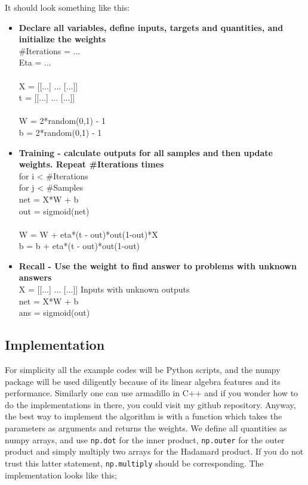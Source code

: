 \documentclass[norsk,a4paper,12pt]{article}
\begin{document}
It should look something like this:
\begin{itemize}
\item \textbf{Declare all variables, define inputs, targets and quantities, and initialize the weights}\\
\#Iterations = ...\\
Eta = ...\\
\\
X = [[...] ... [...]]\\
t = [[...] ... [...]]\\
\\
W = 2*random(0,1) - 1\\
b = 2*random(0,1) - 1\\

\item \textbf{Training - calculate outputs for all samples and then update weights. Repeat \#Iterations times}\\
for i < \#Iterations\\
	for j < \#Samples\\
		net = X*W + b\\
		out = sigmoid(net)\\
		\\
		W = W + eta*(t - out)*out(1-out)*X\\
		b = b + eta*(t - out)*out(1-out)\\

\item \textbf{Recall - Use the weight to find answer to problems with unknown answers}\\
X = [[...] ... [...]]		Inputs with unknown outputs\\
net = X*W + b\\
ans = sigmoid(out)\\
\end{itemize}

\subsection{Implementation}
For simplicity all the example codes will be Python scripts, and the numpy package will be used diligently because of its linear algebra features and its performance. Similarly one can use armadillo in C++ and if you wonder how to do the implementations in there, you could visit my github repository. Anyway, the best way to implement the algorithm is with a function which takes the parameters as arguments and returns the weights. We define all quantities as numpy arrays, and use \lstinline!np.dot! for the inner product, \lstinline!np.outer! for the outer product and simply multiply two arrays for the Hadamard product. If you do not trust this latter statement, \lstinline!np.multiply! should be corresponding. The implementation looks like this;
\end{document}
